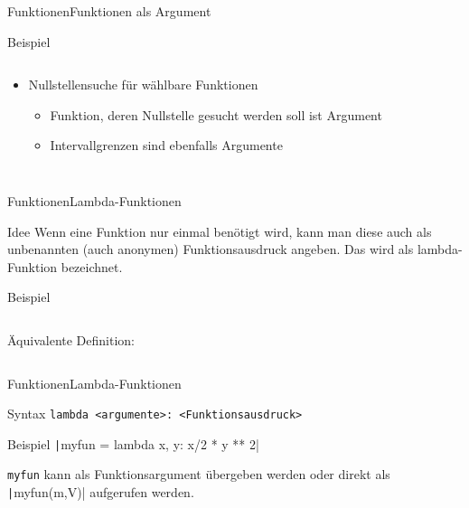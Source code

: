 \documentclass[xelatex,aspectratio=169]{beamer}
\begin{document}
\begin{frame}[fragile]{Funktionen}{Funktionen als Argument}
    \begin{exampleblock}{Beispiel}
        \vspace{-.5\baselineskip}
        \begin{columns}[onlytextwidth]
            \begin{column}{0.42\textwidth}
                \begin{itemize}
                    \item Nullstellensuche für wählbare Funktionen
                          \begin{itemize}
                              \item Funktion, deren Nullstelle gesucht werden soll ist Argument
                              \item Intervallgrenzen sind ebenfalls Argumente
                          \end{itemize}
                \end{itemize}
                \smaller
                \inputminted[firstline=4, lastline=8]{python}{src/functions_nullstellen.py}
            \end{column}
            \begin{column}{0.55\textwidth}
                \smaller
                \inputminted[firstline=11,lastline=25]{python}{src/functions_nullstellen.py}
            \end{column}
        \end{columns}
    \end{exampleblock}
\end{frame}

\begin{frame}{Funktionen}{Lambda-Funktionen}
    \begin{block}{Idee}
        Wenn eine Funktion nur einmal benötigt wird, kann man diese auch als unbenannten (auch anonymen) Funktionsausdruck angeben. Das wird als lambda-Funktion bezeichnet.
    \end{block}
    \begin{exampleblock}{Beispiel}
        \inputminted[firstline=28,lastline=28]{python}{src/functions_nullstellen.py}
        Äquivalente Definition:
        \inputminted[firstline=31]{python}{src/functions_nullstellen.py}
    \end{exampleblock}

\end{frame}

\begin{frame}{Funktionen}{Lambda-Funktionen}
    \begin{block}{Syntax}
        \texttt{lambda <argumente>: <Funktionsausdruck>}
    \end{block}
    \begin{exampleblock}{Beispiel}
        \texttt|myfun = lambda x, y: x/2 * y ** 2|

        \texttt{myfun} kann als Funktionsargument übergeben werden oder direkt als \texttt|myfun(m,V)| aufgerufen werden.
    \end{exampleblock}
\end{frame}
\end{document}

